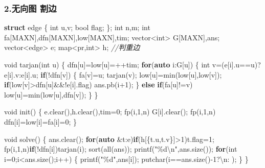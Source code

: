 \documentclass[
]{article}
\newenvironment{Shaded}{}{}
\newcommand{\CharTok}[1]{\textcolor[rgb]{0.25,0.44,0.63}{#1}}
\newcommand{\CommentTok}[1]{\textcolor[rgb]{0.38,0.63,0.69}{\textit{#1}}}
\newcommand{\ControlFlowTok}[1]{\textcolor[rgb]{0.00,0.44,0.13}{\textbf{#1}}}
\newcommand{\DataTypeTok}[1]{\textcolor[rgb]{0.56,0.13,0.00}{#1}}
\newcommand{\DecValTok}[1]{\textcolor[rgb]{0.25,0.63,0.44}{#1}}
\newcommand{\KeywordTok}[1]{\textcolor[rgb]{0.00,0.44,0.13}{\textbf{#1}}}
\newcommand{\NormalTok}[1]{#1}
\newcommand{\SpecialCharTok}[1]{\textcolor[rgb]{0.25,0.44,0.63}{#1}}
\newcommand{\StringTok}[1]{\textcolor[rgb]{0.25,0.44,0.63}{#1}}
\begin{document}
\hypertarget{ux65e0ux5411ux56fe-ux5272ux8fb9}{%
\subsubsection{2.无向图 割边}\label{ux65e0ux5411ux56fe-ux5272ux8fb9}}

\begin{Shaded}
\begin{Highlighting}[]
\KeywordTok{struct}\NormalTok{ edge}
\NormalTok{\{}
    \DataTypeTok{int}\NormalTok{ u,v;}
    \DataTypeTok{bool}\NormalTok{ flag;}
\NormalTok{\};}
\DataTypeTok{int}\NormalTok{ n,m;}
\DataTypeTok{int}\NormalTok{ fa[MAXN],dfn[MAXN],low[MAXN],tim;}
\NormalTok{vector\textless{}}\DataTypeTok{int}\NormalTok{\textgreater{}  G[MAXN],ans;}
\NormalTok{vector\textless{}edge\textgreater{} e;}
\NormalTok{map\textless{}pr,}\DataTypeTok{int}\NormalTok{\textgreater{} h; }\CommentTok{//判重边}

\DataTypeTok{void}\NormalTok{ tarjan(}\DataTypeTok{int}\NormalTok{ u)}
\NormalTok{\{}
\NormalTok{    dfn[u]=low[u]=++tim;}
    \ControlFlowTok{for}\NormalTok{(}\KeywordTok{auto}\NormalTok{ i:G[u])}
\NormalTok{    \{}
        \DataTypeTok{int}\NormalTok{ v=(e[i].u==u)?e[i].v:e[i].u;}
        \ControlFlowTok{if}\NormalTok{(!dfn[v])}
\NormalTok{        \{}
\NormalTok{            fa[v]=u;}
\NormalTok{            tarjan(v);}
\NormalTok{            low[u]=min(low[u],low[v]);}
            \ControlFlowTok{if}\NormalTok{(low[v]\textgreater{}dfn[u]\&\&!e[i].flag)}
\NormalTok{                ans.pb(i+}\DecValTok{1}\NormalTok{);}
\NormalTok{        \}}
        \ControlFlowTok{else} \ControlFlowTok{if}\NormalTok{(fa[u]!=v) low[u]=min(low[u],dfn[v]);}
\NormalTok{    \}}
\NormalTok{\}}

\DataTypeTok{void}\NormalTok{ init()}
\NormalTok{\{}
\NormalTok{    e.clear(),h.clear(),tim=}\DecValTok{0}\NormalTok{;}
\NormalTok{    fp(i,}\DecValTok{1}\NormalTok{,n) G[i].clear();}
\NormalTok{    fp(i,}\DecValTok{1}\NormalTok{,n) dfn[i]=low[i]=fa[i]=}\DecValTok{0}\NormalTok{;}
\NormalTok{\}}

\DataTypeTok{void}\NormalTok{ solve()}
\NormalTok{\{}
\NormalTok{    ans.clear();}
    \ControlFlowTok{for}\NormalTok{(}\KeywordTok{auto}\NormalTok{ \&t:e)}\ControlFlowTok{if}\NormalTok{(h[\{t.u,t.v\}]\textgreater{}}\DecValTok{1}\NormalTok{)t.flag=}\DecValTok{1}\NormalTok{;}
\NormalTok{    fp(i,}\DecValTok{1}\NormalTok{,n)}\ControlFlowTok{if}\NormalTok{(!dfn[i])tarjan(i);}
\NormalTok{    sort(all(ans));}
\NormalTok{    printf(}\StringTok{"}\SpecialCharTok{\%d\textbackslash{}n}\StringTok{"}\NormalTok{,ans.size());}
    \ControlFlowTok{for}\NormalTok{(}\DataTypeTok{int}\NormalTok{ i=}\DecValTok{0}\NormalTok{;i\textless{}ans.size();i++)}
\NormalTok{    \{}
\NormalTok{        printf(}\StringTok{"}\SpecialCharTok{\%d}\StringTok{"}\NormalTok{,ans[i]);}
\NormalTok{        putchar(i==ans.size(){-}}\DecValTok{1}\NormalTok{?}\CharTok{\textquotesingle{}}\SpecialCharTok{\textbackslash{}n}\CharTok{\textquotesingle{}}\NormalTok{:}\CharTok{\textquotesingle{} \textquotesingle{}}\NormalTok{);}
\NormalTok{    \}}
\NormalTok{\}}


\end{Highlighting}
\end{Shaded}
\end{document}
